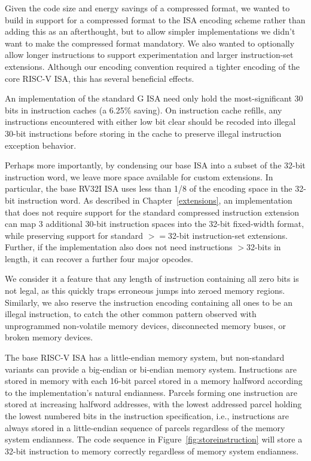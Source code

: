 \begin{commentary}
Given the code size and energy savings of a compressed format, we
wanted to build in support for a compressed format to the ISA encoding
scheme rather than adding this as an afterthought, but to allow
simpler implementations we didn't want to make the compressed format
mandatory. We also wanted to optionally allow longer instructions to
support experimentation and larger instruction-set extensions.
Although our encoding convention required a tighter encoding of the
core RISC-V ISA, this has several beneficial effects.

An implementation of the standard G ISA need only hold the
most-significant 30 bits in instruction caches (a 6.25\% saving).  On
instruction cache refills, any instructions encountered with either
low bit clear should be recoded into illegal 30-bit instructions
before storing in the cache to preserve illegal instruction exception
behavior.

Perhaps more importantly, by condensing our base ISA into a subset of
the 32-bit instruction word, we leave more space available for custom
extensions.  In particular, the base RV32I ISA uses less than 1/8 of
the encoding space in the 32-bit instruction word.  As described in
Chapter~\ref{extensions}, an implementation that does not require
support for the standard compressed instruction extension can map 3
additional 30-bit instruction spaces into the 32-bit fixed-width
format, while preserving support for standard $>=$32-bit
instruction-set extensions.  Further, if the implementation also does
not need instructions $>$32-bits in length, it can recover a further
four major opcodes.
\end{commentary}
\begin{commentary}
We consider it a feature that any length of instruction containing all
zero bits is not legal, as this quickly traps erroneous jumps into
zeroed memory regions. Similarly, we also reserve the instruction
encoding containing all ones to be an illegal instruction, to catch
the other common pattern observed with unprogrammed non-volatile
memory devices, disconnected memory buses, or broken memory devices.
\end{commentary}

The base RISC-V ISA has a little-endian memory system, but
non-standard variants can provide a big-endian or bi-endian memory
system.  Instructions are stored in memory with each 16-bit parcel
stored in a memory halfword according to the implementation's natural
endianness. Parcels forming one instruction are stored at
increasing halfword addresses, with the lowest addressed parcel
holding the lowest numbered bits in the instruction specification,
i.e., instructions are always stored in a little-endian sequence of
parcels regardless of the memory system endianness.  The code sequence
in Figure~\ref{fig:storeinstruction} will store a 32-bit instruction
to memory correctly regardless of memory system endianness.

